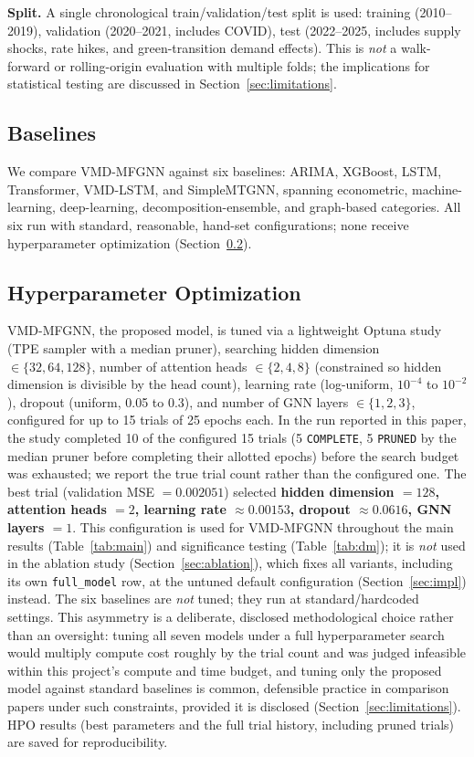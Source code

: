 \documentclass[journal]{IEEEtran}
\begin{document}
\textbf{Split.} A single chronological train/validation/test split is used: training (2010--2019), validation (2020--2021, includes COVID), test (2022--2025, includes supply shocks, rate hikes, and green-transition demand effects). This is \emph{not} a walk-forward or rolling-origin evaluation with multiple folds; the implications for statistical testing are discussed in Section~\ref{sec:limitations}.

\subsection{Baselines}
\label{sec:baselines}

We compare VMD-MFGNN against six baselines: ARIMA, XGBoost, LSTM, Transformer, VMD-LSTM, and SimpleMTGNN, spanning econometric, machine-learning, deep-learning, decomposition-ensemble, and graph-based categories. All six run with standard, reasonable, hand-set configurations; none receive hyperparameter optimization (Section~\ref{sec:hpo}).

\subsection{Hyperparameter Optimization}
\label{sec:hpo}

VMD-MFGNN, the proposed model, is tuned via a lightweight Optuna study (TPE sampler with a median pruner), searching hidden dimension $\in \{32,64,128\}$, number of attention heads $\in \{2,4,8\}$ (constrained so hidden dimension is divisible by the head count), learning rate (log-uniform, $10^{-4}$ to $10^{-2}$), dropout (uniform, 0.05 to 0.3), and number of GNN layers $\in \{1,2,3\}$, configured for up to 15 trials of 25 epochs each. In the run reported in this paper, the study completed 10 of the configured 15 trials (5 \texttt{COMPLETE}, 5 \texttt{PRUNED} by the median pruner before completing their allotted epochs) before the search budget was exhausted; we report the true trial count rather than the configured one. The best trial (validation MSE $= 0.002051$) selected \textbf{hidden dimension $=128$, attention heads $=2$, learning rate $\approx 0.00153$, dropout $\approx 0.0616$, GNN layers $=1$}. This configuration is used for VMD-MFGNN throughout the main results (Table~\ref{tab:main}) and significance testing (Table~\ref{tab:dm}); it is \emph{not} used in the ablation study (Section~\ref{sec:ablation}), which fixes all variants, including its own \texttt{full\_model} row, at the untuned default configuration (Section~\ref{sec:impl}) instead. The six baselines are \emph{not} tuned; they run at standard/hardcoded settings. This asymmetry is a deliberate, disclosed methodological choice rather than an oversight: tuning all seven models under a full hyperparameter search would multiply compute cost roughly by the trial count and was judged infeasible within this project's compute and time budget, and tuning only the proposed model against standard baselines is common, defensible practice in comparison papers under such constraints, provided it is disclosed (Section~\ref{sec:limitations}). HPO results (best parameters and the full trial history, including pruned trials) are saved for reproducibility.
\end{document}
